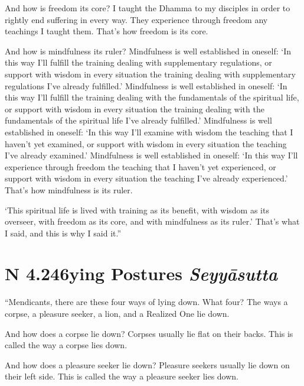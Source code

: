 \documentclass[12pt,openany]{book}%
\newcommand*{\suttatitleacronym}[1]{\smaller[2]{#1}\vspace*{.3em}}
\newcommand*{\suttatitletranslation}[1]{\linebreak{#1}}
\newcommand*{\suttatitleroot}[1]{\linebreak\smaller[2]\itshape{#1}}
\newcommand*{\tocacronym}[1]{\hspace*{-3.3em}{#1}\quad}
\newcommand*{\toctranslation}[1]{#1}
\newcommand*{\tocroot}[1]{(\textit{#1})}
\begin{document}
And how is freedom its core? I taught the Dhamma to my disciples in order to rightly end suffering in every way. They experience through freedom any teachings I taught them. That’s how freedom is its core. 

And how is mindfulness its ruler? Mindfulness is well established in oneself: ‘In this way I’ll fulfill the training dealing with supplementary regulations, or support with wisdom in every situation the training dealing with supplementary regulations I’ve already fulfilled.’ Mindfulness is well established in oneself: ‘In this way I’ll fulfill the training dealing with the fundamentals of the spiritual life, or support with wisdom in every situation the training dealing with the fundamentals of the spiritual life I’ve already fulfilled.’ Mindfulness is well established in oneself: ‘In this way I’ll examine with wisdom the teaching that I haven’t yet examined, or support with wisdom in every situation the teaching I’ve already examined.’ Mindfulness is well established in oneself: ‘In this way I’ll experience through freedom the teaching that I haven’t yet experienced, or support with wisdom in every situation the teaching I’ve already experienced.’ That’s how mindfulness is its ruler. 

‘This spiritual life is lived with training as its benefit, with wisdom as its overseer, with freedom as its core, and with mindfulness as its ruler.’ That’s what I said, and this is why I said it.” 

%
\section*{{\suttatitleacronym AN 4.246}{\suttatitletranslation Lying Postures }{\suttatitleroot Seyyāsutta}}
\addcontentsline{toc}{section}{\tocacronym{AN 4.246} \toctranslation{Lying Postures } \tocroot{Seyyāsutta}}

“Mendicants, there are these four ways of lying down. What four? The ways a corpse, a pleasure seeker, a lion, and a Realized One lie down. 

And how does a corpse lie down? Corpses usually lie flat on their backs. This is called the way a corpse lies down. 

And how does a pleasure seeker lie down? Pleasure seekers usually lie down on their left side. This is called the way a pleasure seeker lies down. 
\end{document}
